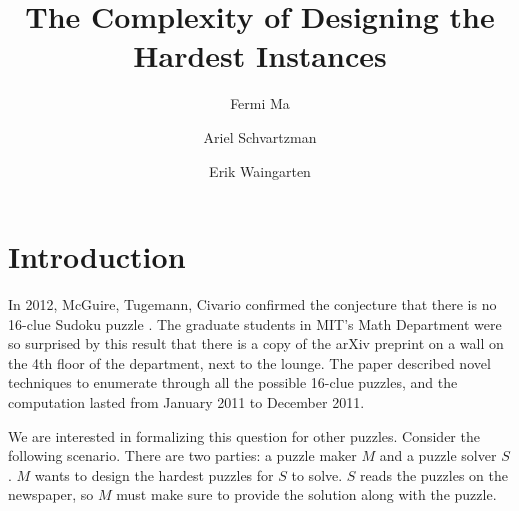 \documentclass[runningheads,a4paper]{llncs}
\begin{document}
\mainmatter  %

\title{The Complexity of Designing the Hardest Instances}


%
%
\author{Fermi Ma \and Ariel Schvartzman \and Erik Waingarten}
%


%
%

\maketitle

\section{Introduction}

In 2012, McGuire, Tugemann, Civario confirmed the conjecture that there is no 16-clue Sudoku puzzle \cite{mcguire2012there}. The graduate students in MIT's Math Department were so surprised by this result that there is a copy of the arXiv preprint on a wall on the 4th floor of the department, next to the lounge. The paper described novel techniques to enumerate through all the possible 16-clue puzzles, and the computation lasted from January 2011 to December 2011. 

We are interested in formalizing this question for other puzzles. Consider the following scenario. There are two parties: a puzzle maker $M$ and a puzzle solver $S$. $M$ wants to design the hardest puzzles for $S$ to solve. $S$ reads the puzzles on the newspaper, so $M$ must make sure to provide the solution along with the puzzle. 
\end{document}
